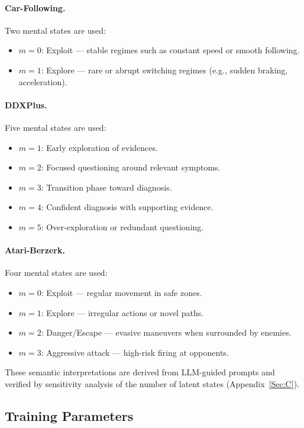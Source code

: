 \documentclass{article} %
\begin{document}
\paragraph{Car-Following.}
Two mental states are used:
\begin{itemize}
  \item $m=0$: Exploit --- stable regimes such as constant speed or smooth following.
  \item $m=1$: Explore --- rare or abrupt switching regimes (e.g., sudden braking, acceleration).
\end{itemize}

\paragraph{DDXPlus.}
Five mental states are used:
\begin{itemize}
  \item $m=1$: Early exploration of evidences.
  \item $m=2$: Focused questioning around relevant symptoms.
  \item $m=3$: Transition phase toward diagnosis.
  \item $m=4$: Confident diagnosis with supporting evidence.
  \item $m=5$: Over-exploration or redundant questioning.
\end{itemize}

\paragraph{Atari-Berzerk.}
Four mental states are used:
\begin{itemize}
  \item $m=0$: Exploit --- regular movement in safe zones.
  \item $m=1$: Explore --- irregular actions or novel paths.
  \item $m=2$: Danger/Escape --- evasive maneuvers when surrounded by enemies.
  \item $m=3$: Aggressive attack --- high-risk firing at opponents.
\end{itemize}

These semantic interpretations are derived from LLM-guided prompts and verified by sensitivity analysis of the number of latent states (Appendix~\ref{Sec:C}).

\subsection{Training Parameters}
\label{Sec:B7}
\end{document}

